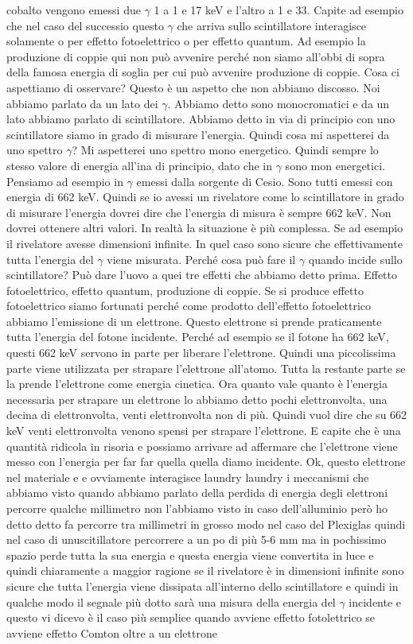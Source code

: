 cobalto vengono emessi due $\gamma$ 1 a 1 e 17 keV e l'altro a 1 e 33. Capite ad esempio che nel caso del successio questo $\gamma$ che arriva sullo scintillatore interagisce solamente o per effetto fotoelettrico o per effetto quantum. Ad esempio la produzione di coppie qui non può avvenire perché non siamo all'obbi di sopra della famosa energia di soglia per cui può avvenire produzione di coppie. Cosa ci aspettiamo di osservare? Questo è un aspetto che non abbiamo discosso. Noi abbiamo parlato da un lato dei $\gamma$. Abbiamo detto sono monocromatici e da un lato abbiamo parlato di scintillatore. Abbiamo detto in via di principio con uno scintillatore siamo in grado di misurare l'energia. Quindi cosa mi aspetterei da uno spettro $\gamma$? Mi aspetterei uno spettro mono energetico. Quindi sempre lo stesso valore di energia all'ina di principio, dato che in $\gamma$ sono mon energetici. Pensiamo ad esempio in $\gamma$ emessi dalla sorgente di Cesio. Sono tutti emessi con energia di 662 keV. Quindi se io avessi un rivelatore come lo scintillatore in grado di misurare l'energia dovrei dire che l'energia di misura è sempre 662 keV. Non dovrei ottenere altri valori. In realtà la situazione è più complessa. Se ad esempio il rivelatore avesse dimensioni infinite. In quel caso sono sicure che effettivamente tutta l'energia del $\gamma$ viene misurata. Perché cosa può fare il $\gamma$ quando incide sullo scintillatore? Può dare l'uovo a quei tre effetti che abbiamo detto prima. Effetto fotoelettrico, effetto quantum, produzione di coppie. Se si produce effetto fotoelettrico siamo fortunati perché come prodotto dell'effetto fotoelettrico abbiamo l'emissione di un elettrone. Questo elettrone si prende praticamente tutta l'energia del fotone incidente. Perché ad esempio se il fotone ha 662 keV, questi 662 keV servono in parte per liberare l'elettrone. Quindi una piccolissima parte viene utilizzata per strapare l'elettrone all'atomo. Tutta la restante parte se la prende l'elettrone come energia cinetica. Ora quanto vale quanto è l'energia necessaria per strapare un elettrone lo abbiamo detto pochi elettronvolta, una decina di elettronvolta, venti elettronvolta non di più. Quindi vuol dire che su 662 keV venti elettronvolta venono spensi per strapare l'elettrone. E capite che è una quantità ridicola in risoria e possiamo arrivare ad affermare che l'elettrone viene messo con l'energia per far far quella quella diamo incidente. Ok, questo elettrone nel materiale e e ovviamente interagisce laundry laundry i meccanismi che abbiamo visto quando abbiamo parlato della perdida di energia degli elettroni percorre qualche millimetro non l'abbiamo visto in caso dell'alluminio però ho detto detto fa percorre tra millimetri in grosso modo nel caso del Plexiglas quindi nel caso di unuscitillatore percorrere a un po di più 5-6 mm ma in pochissimo spazio perde tutta la sua energia e questa energia viene convertita in luce e quindi chiaramente a maggior ragione se il rivelatore è in dimensioni infinite sono sicure che tutta l'energia viene dissipata all'interno dello scintillatore e quindi in qualche modo il segnale più dotto sarà una misura della energia del $\gamma$ incidente e questo vi dicevo è il caso più semplice quando avviene effetto fotolettrico se avviene effetto Comton oltre a un elettrone 